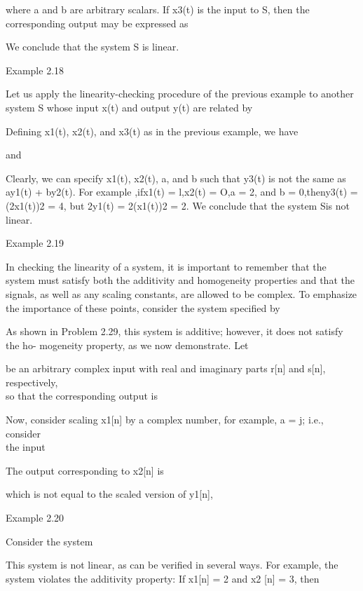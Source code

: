 \documentclass{report}
\begin{document}
where a and b are arbitrary scalars. If x3(t) is the input to S, then the corresponding output may be expressed as



We conclude that the system S is linear.

Example 2.18

Let us apply the linearity-checking procedure of the previous example to another system S whose input x(t) and output y(t) are related by



Defining x1(t), x2(t), and x3(t) as in the previous example, we have



and



Clearly, we can specify x1(t), x2(t), a, and b such that y3(t) is not the same as ay1(t) + by2(t). { }For example ,ifx1(t) = l,x2(t) = O,a = 2, and
b = 0,theny3(t) = (2x1(t))2 = 4, but 2y1(t) = 2(x1(t))2 = 2. We conclude that the system Sis not linear.

Example 2.19

In checking the linearity of a system, it is important to remember that the system must satisfy both the additivity and homogeneity properties and
that the signals, as well as any scaling constants, are allowed to be complex. To emphasize the importance of these points, consider the system specified
by



As shown in Problem 2.29, this system is additive; however, it does not satisfy the ho- mogeneity property, as we now demonstrate. Let



be an arbitrary complex input with real and imaginary parts r[n] and s[n], respectively,\\
so that the corresponding output is



Now, consider scaling x1[n] by a complex number, for example, a = j; i.e., consider\\
the input



The output corresponding to x2[n] is



which is not equal to the scaled version of y1[n],

Example 2.20

Consider the system



This system is not linear, as can be verified in several ways. For example, the system violates the additivity property: If x1[n] = 2 and x2 [n]
= 3, then
\end{document}
